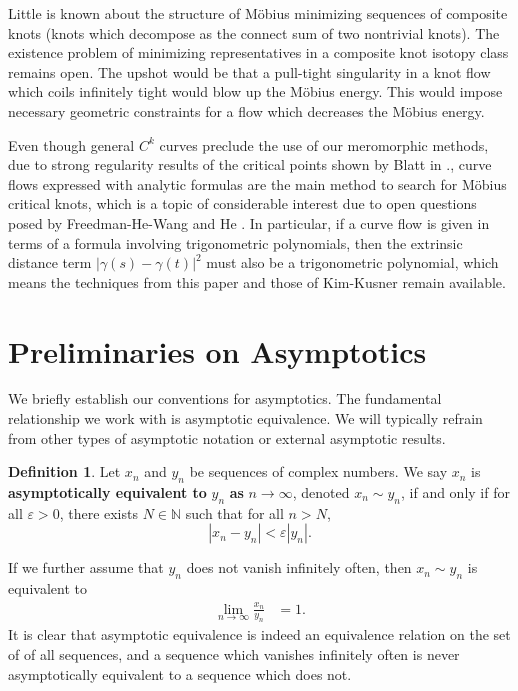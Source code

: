 \documentclass{amsart}
\theoremstyle{plain}
\numberwithin{theorem}{section}
\theoremstyle{definition}
\newtheorem{definition}[theorem]{Definition}
\theoremstyle{remark}
\theoremstyle{brakets}
\newcommand{\N}{\mathbb{N}}
\newcommand{\vep}{\varepsilon}
\begin{document}
Little is known about the structure of M\"obius minimizing sequences of composite knots (knots which decompose as the connect sum of two nontrivial knots). The existence problem of minimizing representatives in a composite knot isotopy class remains open. The upshot would be that a pull-tight singularity in a knot flow which coils infinitely tight would blow up the M\"obius energy. This would impose necessary geometric constraints for a flow which decreases the M\"obius energy.  

Even though general $C^k$ curves preclude the use of our meromorphic methods, due to strong regularity results of the critical points shown by Blatt in \cite{blatt20}., curve flows expressed with analytic formulas are the main method to search for M\"obius critical knots, which is a topic of considerable interest due to open questions posed by Freedman-He-Wang and He \cite{freedman1994mobius,he2000}. In particular, if a curve flow is given in terms of a formula involving trigonometric polynomials, then the extrinsic distance term $|\gamma(s)-\gamma(t)|^2$ must also be a trigonometric polynomial, which means the techniques from this paper and those of Kim-Kusner remain available.

\section{Preliminaries on Asymptotics}
We briefly establish our conventions for asymptotics. The fundamental relationship we work with is asymptotic equivalence. We will typically refrain from other types of asymptotic notation or external asymptotic results.

\begin{definition}
    Let $x_n$ and $y_n$ be sequences of complex numbers. We say $x_n$ is \textbf{asymptotically equivalent to} $y_n$ \textbf{as} $n \to \infty$, denoted $x_n \sim y_n$, if and only if for all $\vep > 0$, there exists $N \in \N$ such that for all $n > N$,  $$|x_n - y_n| < \vep |y_n|.$$ 
\end{definition}
If we further assume that $y_n$ does not vanish infinitely often, then $x_n \sim y_n$ is equivalent to 
\begin{align*}
    \lim\limits_{n \to \infty} \frac{x_n}{y_n} &= 1.
\end{align*}
It is clear that asymptotic equivalence is indeed an equivalence relation on the set of of all sequences, and a sequence which vanishes infinitely often is never asymptotically equivalent to a sequence which does not.
\end{document}
